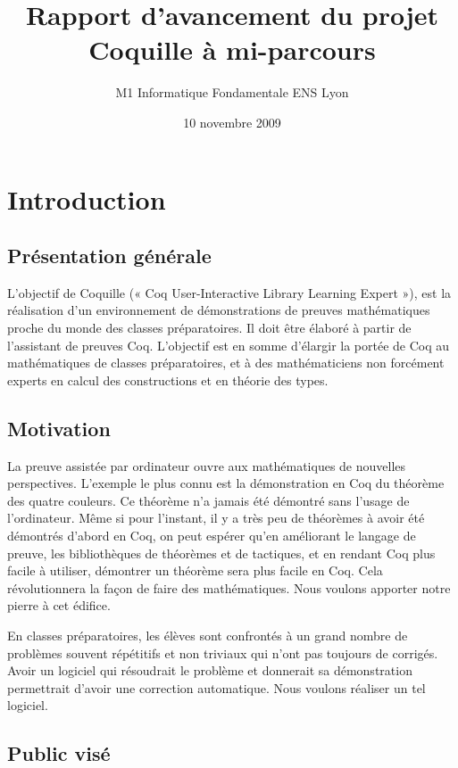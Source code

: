 \documentclass[a4paper,10pt]{article}
\date{10 novembre 2009}
\title{Rapport d'avancement du projet Coquille à mi-parcours}
\author{M1 Informatique Fondamentale ENS Lyon}
\begin{document}
\maketitle
\newpage
\section{Introduction}

\subsection{Présentation générale}

L’objectif de Coquille (« Coq User-Interactive Library Learning Expert »),
  est la réalisation d’un environnement de démonstrations de preuves mathématiques proche du monde des classes préparatoires. 
Il doit être élaboré à partir de l’assistant de preuves Coq. 
L’objectif est en somme d’élargir la portée de Coq au mathématiques de classes préparatoires,
 et à des mathématiciens non forcément experts en calcul des constructions et en théorie des types.

\subsection{Motivation}

La preuve assistée par ordinateur ouvre aux mathématiques de nouvelles perspectives. 
L'exemple le plus connu est la démonstration en Coq du théorème des quatre couleurs.  
Ce théorème n'a jamais été démontré sans l'usage de l'ordinateur.
 Même si pour l'instant, il y a très peu de théorèmes à avoir été démontrés d'abord en Coq, 
on peut espérer qu'en améliorant le langage de preuve, les bibliothèques de théorèmes et de tactiques, et en rendant Coq plus facile à utiliser,
 démontrer un théorème sera plus facile en Coq. 
Cela révolutionnera la façon de faire des mathématiques. Nous voulons apporter notre pierre à cet édifice.

En classes préparatoires, les élèves sont confrontés à un grand nombre de problèmes souvent répétitifs et non triviaux qui n'ont pas toujours 
de corrigés. Avoir un logiciel qui résoudrait le problème et donnerait sa démonstration permettrait d'avoir une correction automatique.
Nous voulons réaliser un tel logiciel.

\subsection{Public visé}
\end{document}
